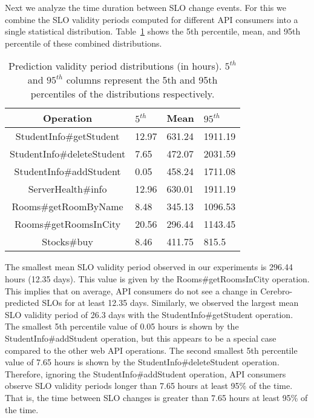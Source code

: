 Next we analyze the time duration between SLO change events. For this we combine the SLO validity
periods computed for different API consumers into a single statistical distribution. 
Table~\ref{tab:validity_periods} shows the 5th percentile, mean, and 95th percentile 
of these combined distributions. 

\begin{table}
\begin{center}
\begin{tabular}{|c|p{2cm}|p{2cm}|p{2cm}|}
\hline
Operation & $5^{th}$ & Mean & $95^{th}$ \\ \hline
StudentInfo\#getStudent & 12.97 & 631.24 & 1911.19 \\ \hline
StudentInfo\#deleteStudent & 7.65 & 472.07 & 2031.59 \\ \hline
StudentInfo\#addStudent & 0.05 & 458.24 & 1711.08 \\ \hline
ServerHealth\#info & 12.96 & 630.01 & 1911.19 \\ \hline
Rooms\#getRoomByName & 8.48 & 345.13 & 1096.53 \\ \hline
Rooms\#getRoomsInCity & 20.56 & 296.44 & 1143.45 \\ \hline
Stocks\#buy & 8.46 & 411.75 & 815.5 \\ \hline
\end{tabular}
\end{center}
\caption{Prediction validity period distributions (in hours).
$5^{th}$ and $95^{th}$ 
columns represent the 5th and 95th percentiles of the
distributions respectively.
\label{tab:validity_periods}
}
\end{table}

The smallest
mean SLO validity period observed in our experiments is 296.44 hours (12.35 days). This value is given by the
Rooms\#getRoomsInCity operation. 
This implies that on average, API consumers do not see a change in Cerebro-predicted SLOs
for at least 12.35 days. Similarly, we observed the largest mean SLO validity period of 26.3 days with the
StudentInfo\#getStudent operation.
The smallest 5th percentile value of 0.05 hours is shown by
the StudentInfo\#addStudent operation, but this appears to be a special case compared to the other web API
operations. The second smallest 5th percentile value of 7.65 hours is shown by the 
StudentInfo\#deleteStudent operation. Therefore, ignoring the StudentInfo\#addStudent operation, API
consumers observe SLO validity periods longer than 7.65 hours at least 95\% of the time. That is, the time
between SLO changes is greater than 7.65 hours at least 95\% of the time.

